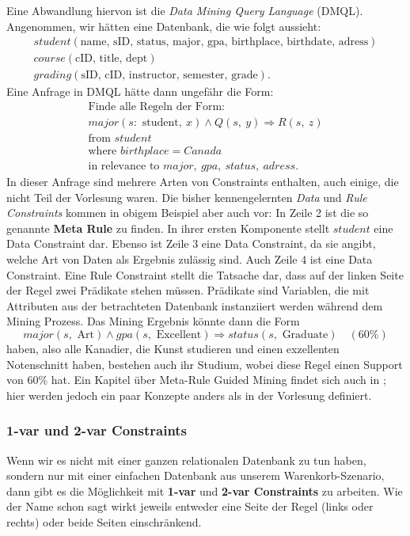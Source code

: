 Eine Abwandlung hiervon ist die \textit{Data Mining Query
Language} (DMQL). Angenommen, wir hätten eine Datenbank, die wie folgt aussieht:
\begin{align*}
	student(\text{name, sID, status, major, gpa, birthplace,
	birthdate, adress})\\
	course(\text{cID, title, dept})\\
	grading(\text{sID, cID, instructor, semester, grade}).
\end{align*}
Eine Anfrage in DMQL hätte dann ungefähr die Form:
\begin{align}
	\text{Finde alle Regeln der Form:}\\
	major(s:\text{ student},\ x)\wedge Q(s,\ y)
	\Longrightarrow R(s,\ z)\\
	\text{from } student\\
	\text{where } birthplace = Canada\\
	\text{in relevance to } major,\ gpa,\ status,\ adress.
\end{align}
In dieser Anfrage sind mehrere Arten von Constraints
enthalten, auch einige, die nicht Teil der Vorlesung waren.
Die bisher kennengelernten \textit{Data} und 
\textit{Rule Constraints} kommen in obigem Beispiel
aber auch vor: In Zeile 2 ist die so genannte \textbf{
Meta Rule} zu finden. In ihrer ersten Komponente stellt
\(student\) eine Data Constraint dar. Ebenso ist Zeile 3
eine Data Constraint, da sie angibt, welche Art von Daten 
als Ergebnis zulässig sind. Auch Zeile 4 ist eine Data 
Constraint. Eine Rule Constraint stellt die Tatsache dar, dass
auf der linken Seite der Regel zwei Prädikate stehen müssen.
Prädikate sind Variablen, die mit Attributen aus der 
betrachteten Datenbank instanziiert werden während dem
Mining Prozess. Das Mining Ergebnis könnte dann die Form
\[
major(s,\text{ Art}) \wedge gpa(s, \text{ Excellent})
\Longrightarrow status(s, \text{ Graduate})
\quad (60\%)
\]
haben, also alle Kanadier, die Kunst studieren und einen
exzellenten Notenschnitt haben, bestehen auch ihr Studium,
wobei diese Regel einen Support von 60\(\%\) hat. Ein 
Kapitel über Meta-Rule Guided Mining findet sich auch in
\citet{HanBOOK}; hier werden jedoch ein paar Konzepte
anders als in der Vorlesung definiert. 

\subsubsection{1-var und 2-var Constraints}
Wenn wir es nicht mit einer ganzen relationalen Datenbank
zu tun haben, sondern nur mit einer einfachen Datenbank
aus unserem Warenkorb-Szenario, dann gibt es die Möglichkeit
mit \textbf{1-var} und \textbf{2-var Constraints} zu 
arbeiten. Wie der Name schon sagt wirkt jeweils entweder
eine Seite der Regel (links oder rechts) oder beide Seiten 
einschränkend. 

